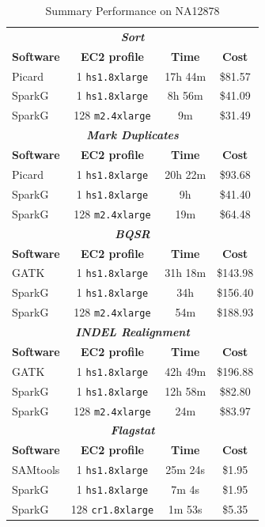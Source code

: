 \documentclass[10pt]{report} %
\begin{document}
\begin{table}[h]
\caption{Summary Performance on NA12878}
\label{tab:overview}
\begin{center}
\begin{tabular}{ l c c c }
\hline
\multicolumn{4}{c}{\bf \textit{Sort}} \\
\bf Software & \bf EC2 profile & \bf Time & \bf Cost \\
\hline
Picard & 1 \texttt{hs1.8xlarge} & 17h 44m & \$81.57 \\
SparkG & 1 \texttt{hs1.8xlarge} & 8h 56m & \$41.09 \\
SparkG & 128 \texttt{m2.4xlarge} & 9m & \$31.49 \\
\hline
\multicolumn{4}{c}{\bf \textit{Mark Duplicates}} \\
\bf Software & \bf EC2 profile & \bf Time & \bf Cost  \\
\hline
Picard & 1 \texttt{hs1.8xlarge} & 20h 22m & \$93.68 \\
SparkG & 1 \texttt{hs1.8xlarge} & 9h & \$41.40 \\
SparkG & 128 \texttt{m2.4xlarge} & 19m & \$64.48 \\ 
\hline
\multicolumn{4}{c}{\bf \textit{BQSR}} \\
\bf Software & \bf EC2 profile & \bf Time & \bf Cost  \\
\hline
GATK & 1 \texttt{hs1.8xlarge} & 31h 18m & \$143.98 \\
SparkG & 1 \texttt{hs1.8xlarge} & 34h & \$156.40 \\
SparkG & 128 \texttt{m2.4xlarge} & 54m & \$188.93 \\
\hline
\multicolumn{4}{c}{\bf \textit{INDEL Realignment}} \\
\bf Software & \bf EC2 profile & \bf Time & \bf Cost  \\
\hline
GATK & 1 \texttt{hs1.8xlarge} & 42h 49m & \$196.88 \\
SparkG & 1 \texttt{hs1.8xlarge} & 12h 58m & \$82.80 \\
SparkG & 128 \texttt{m2.4xlarge} & 24m & \$83.97 \\
\hline
\multicolumn{4}{c}{\bf \textit{Flagstat}} \\
\bf Software & \bf EC2 profile & \bf Time & \bf Cost  \\
\hline
SAMtools & 1 \texttt{hs1.8xlarge} & 25m 24s & \$1.95 \\
SparkG & 1 \texttt{hs1.8xlarge} & 7m 4s & \$1.95 \\
SparkG & 128 \texttt{cr1.8xlarge} & 1m 53s & \$5.35 \\
\hline
\end{tabular}
\end{center}
\end{table}
\end{document}
